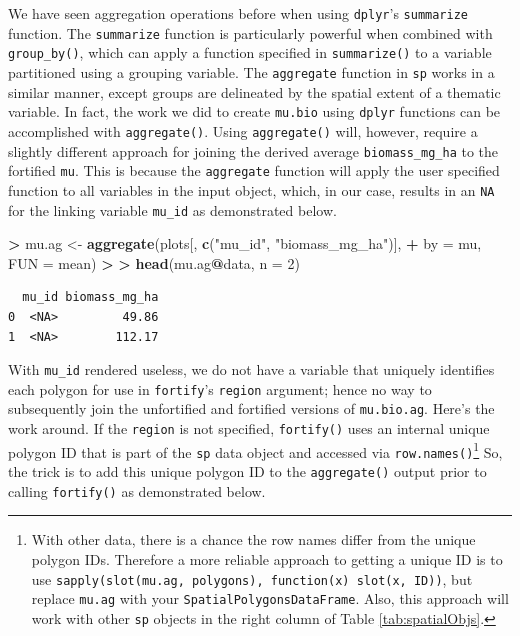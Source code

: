 \documentclass[]{krantz}
\makeatletter
\newenvironment{Shaded}{\begin{snugshade}}{\end{snugshade}}
\newcommand{\DataTypeTok}[1]{\textcolor[rgb]{0.27,0.27,0.27}{#1}}
\newcommand{\DecValTok}[1]{\textcolor[rgb]{0.06,0.06,0.06}{#1}}
\newcommand{\ErrorTok}[1]{\textcolor[rgb]{0.14,0.14,0.14}{\textbf{#1}}}
\newcommand{\KeywordTok}[1]{\textcolor[rgb]{0.27,0.27,0.27}{\textbf{#1}}}
\newcommand{\NormalTok}[1]{#1}
\newcommand{\OperatorTok}[1]{\textcolor[rgb]{0.43,0.43,0.43}{\textbf{#1}}}
\newcommand{\StringTok}[1]{\textcolor[rgb]{0.5,0.5,0.5}{#1}}
\newenvironment{kframe}{%
\medskip{}
\setlength{\fboxsep}{.8em}
 \def\at@end@of@kframe{}%
 \ifinner\ifhmode%
  \def\at@end@of@kframe{\end{minipage}}%
  \begin{minipage}{\columnwidth}%
 \fi\fi%
 \def\FrameCommand##1{\hskip\@totalleftmargin \hskip-\fboxsep
 \colorbox{shadecolor}{##1}\hskip-\fboxsep
     \hskip-\linewidth \hskip-\@totalleftmargin \hskip\columnwidth}%
 \MakeFramed {\advance\hsize-\width
   \@totalleftmargin\z@ \linewidth\hsize
   \@setminipage}}%
 {\par\unskip\endMakeFramed%
 \at@end@of@kframe}
\renewenvironment{Shaded}{\begin{kframe}}{\end{kframe}}
\makeatother
\begin{document}
We have seen aggregation operations before when using \texttt{dplyr}'s \texttt{summarize} function. The \texttt{summarize} function is particularly powerful when combined with \texttt{group\_by()}, which can apply a function specified in \texttt{summarize()} to a variable partitioned using a grouping variable. The \texttt{aggregate} function in \texttt{sp} works in a similar manner, except groups are delineated by the spatial extent of a thematic variable. In fact, the work we did to create \texttt{mu.bio} using \texttt{dplyr} functions can be accomplished with \texttt{aggregate()}. Using \texttt{aggregate()} will, however, require a slightly different approach for joining the derived average \texttt{biomass\_mg\_ha} to the fortified \texttt{mu}. This is because the \texttt{aggregate} function will apply the user specified function to all variables in the input object, which, in our case, results in an \texttt{NA} for the linking variable \texttt{mu\_id} as demonstrated below.

\begin{Shaded}
\begin{Highlighting}[]
\OperatorTok{>}\StringTok{ }\NormalTok{mu.ag <-}\StringTok{ }\KeywordTok{aggregate}\NormalTok{(plots[, }\KeywordTok{c}\NormalTok{(}\StringTok{"mu_id"}\NormalTok{, }\StringTok{"biomass_mg_ha"}\NormalTok{)], }
\OperatorTok{+}\StringTok{   }\DataTypeTok{by =}\NormalTok{ mu, }\DataTypeTok{FUN =}\NormalTok{ mean)}
\OperatorTok{>}\StringTok{ }
\ErrorTok{>}\StringTok{ }\KeywordTok{head}\NormalTok{(mu.ag}\OperatorTok{@}\NormalTok{data, }\DataTypeTok{n =} \DecValTok{2}\NormalTok{)}
\end{Highlighting}
\end{Shaded}

\begin{verbatim}
  mu_id biomass_mg_ha
0  <NA>         49.86
1  <NA>        112.17
\end{verbatim}

With \texttt{mu\_id} rendered useless, we do not have a variable that uniquely identifies each polygon for use in \texttt{fortify}'s \texttt{region} argument; hence no way to subsequently join the unfortified and fortified versions of \texttt{mu.bio.ag}. Here's the work around. If the \texttt{region} is not specified, \texttt{fortify()} uses an internal unique polygon ID that is part of the \texttt{sp} data object and accessed via \texttt{row.names()}\footnote{With other data, there is a chance the row names differ from the unique polygon IDs. Therefore a more reliable approach to getting a unique ID is to use \texttt{sapply(slot(mu.ag,\ \textquotesingle{}polygons\textquotesingle{}),\ function(x)\ slot(x,\ \textquotesingle{}ID\textquotesingle{}))}, but replace \texttt{mu.ag} with your \texttt{SpatialPolygonsDataFrame}. Also, this approach will work with other \texttt{sp} objects in the right column of Table \ref{tab:spatialObjs}.} So, the trick is to add this unique polygon ID to the \texttt{aggregate()} output prior to calling \texttt{fortify()} as demonstrated below.
\end{document}
